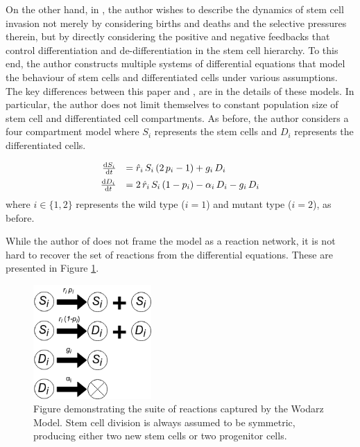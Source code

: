 \documentclass[12pt]{article}
\renewcommand{\d}{{\rm d}}
\begin{document}
On the other hand, in \cite{wodarz}, the author wishes to describe the dynamics of stem cell invasion not merely by considering births and deaths and the selective pressures therein, but by directly considering the positive and negative feedbacks that control differentiation and de-differentiation in the stem cell hierarchy. To this end, the author constructs multiple systems of differential equations that model the behaviour of stem cells and differentiated cells under various assumptions. The key differences between this paper and \cite{mohammad}, are in the details of these models. In particular, the author does not limit themselves to constant population size of stem cell and differentiated cell compartments. As before, the author considers a four compartment model where $S_i$ represents the stem cells and $D_i$ represents the differentiated cells. 

\begin{equation}
\begin{array}{rl}
\frac{\d S_i}{\d t}&= \hat{r}_i\,S_i\,(2\,p_i-1)+g_i\,D_i\vspace*{5pt}\\
\frac{\d D_i}{\d t}&= 2\,\hat{r}_i\,S_i\,(1-p_i)-\alpha_i\,D_i-g_i\,D_i
\end{array}
\end{equation}\label{wodDE}
where $i\in\{1,2\}$ represents the wild type ($i=1$) and mutant type ($i=2$), as before.

While the author of \cite{wodarz} does not frame the model as a reaction network, it is not hard to recover the set of reactions from the differential equations. These are presented in Figure \ref{wodarzRxns}. 

\begin{figure}
\begin{center}
\includegraphics[width=0.4\textwidth]{wodarz-rxns.png}
\end{center}
\caption{Figure demonstrating the suite of reactions captured by the Wodarz Model. Stem cell division is always assumed to be symmetric, producing either two new stem cells or two progenitor cells.}\label{wodarzRxns}
\end{figure}
\end{document}
